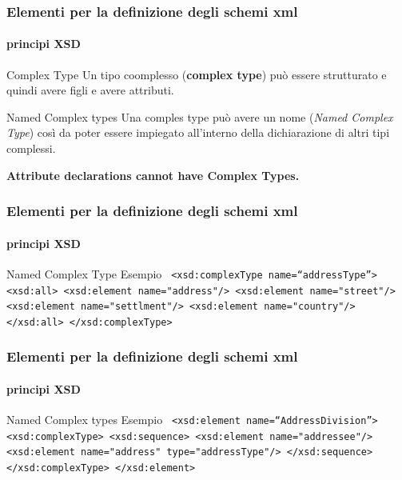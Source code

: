 

\begin{frame}
	\frametitle{Elementi per la definizione degli schemi xml}
	\framesubtitle{principi XSD}
	\addtocounter{nframe}{1}

	\begin{block}{Complex Type}
		Un tipo coomplesso (\textbf{complex type}) può essere strutturato e quindi avere figli e avere attributi.

	\end{block}

	\begin{block}{Named Complex types}
		Una comples type può avere un nome (\textit{Named Complex Type}) così da poter essere impiegato all'interno della dichiarazione di altri tipi complessi.
	\end{block}

	\textbf{Attribute declarations cannot have Complex Types.}

\end{frame}




\begin{frame}
	\frametitle{Elementi per la definizione degli schemi xml}
	\framesubtitle{principi XSD}
	\addtocounter{nframe}{1}

	\begin{block}{Named Complex Type Esempio}
		\texttt{
			<xsd:complexType name=``addressType''>
			<xsd:all>
			<xsd:element name="address"/>
			<xsd:element name="street"/>
			<xsd:element name="settlment"/>
			<xsd:element name="country"/>
			</xsd:all>
			</xsd:complexType>
		}
	\end{block}

\end{frame}

\begin{frame}
	\frametitle{Elementi per la definizione degli schemi xml}
	\framesubtitle{principi XSD}
	\addtocounter{nframe}{1}

	\begin{block}{Named Complex types Esempio}
		\texttt{
			<xsd:element name=``AddressDivision''>
			<xsd:complexType>
			<xsd:sequence>
			<xsd:element name="addressee"/>
			<xsd:element name="address" type="addressType"/>
			</xsd:sequence>
			</xsd:complexType>
			</xsd:element>
		}
	\end{block}

\end{frame}

